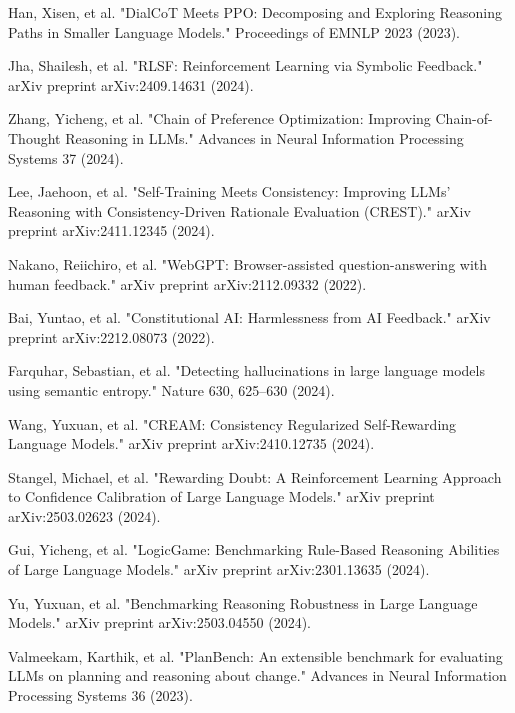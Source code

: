 Han, Xisen, et al. "DialCoT Meets PPO: Decomposing and Exploring Reasoning Paths in Smaller Language Models." Proceedings of EMNLP 2023 (2023).

Jha, Shailesh, et al. "RLSF: Reinforcement Learning via Symbolic Feedback." arXiv preprint arXiv:2409.14631 (2024).

Zhang, Yicheng, et al. "Chain of Preference Optimization: Improving Chain-of-Thought Reasoning in LLMs." Advances in Neural Information Processing Systems 37 (2024).

Lee, Jaehoon, et al. "Self-Training Meets Consistency: Improving LLMs' Reasoning with Consistency-Driven Rationale Evaluation (CREST)." arXiv preprint arXiv:2411.12345 (2024).

Nakano, Reiichiro, et al. "WebGPT: Browser-assisted question-answering with human feedback." arXiv preprint arXiv:2112.09332 (2022).

Bai, Yuntao, et al. "Constitutional AI: Harmlessness from AI Feedback." arXiv preprint arXiv:2212.08073 (2022).

Farquhar, Sebastian, et al. "Detecting hallucinations in large language models using semantic entropy." Nature 630, 625–630 (2024).

Wang, Yuxuan, et al. "CREAM: Consistency Regularized Self-Rewarding Language Models." arXiv preprint arXiv:2410.12735 (2024).

Stangel, Michael, et al. "Rewarding Doubt: A Reinforcement Learning Approach to Confidence Calibration of Large Language Models." arXiv preprint arXiv:2503.02623 (2024).

Gui, Yicheng, et al. "LogicGame: Benchmarking Rule-Based Reasoning Abilities of Large Language Models." arXiv preprint arXiv:2301.13635 (2024).

Yu, Yuxuan, et al. "Benchmarking Reasoning Robustness in Large Language Models." arXiv preprint arXiv:2503.04550 (2024).

Valmeekam, Karthik, et al. "PlanBench: An extensible benchmark for evaluating LLMs on planning and reasoning about change." Advances in Neural Information Processing Systems 36 (2023).

